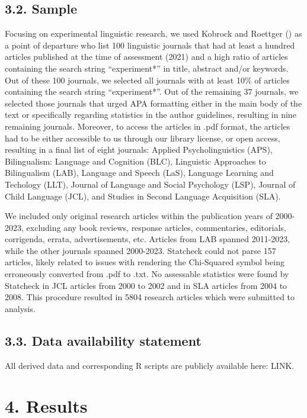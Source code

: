 \documentclass[
  doc,
  longtable,
  nolmodern,
  notxfonts,
  notimes,
  colorlinks=true,linkcolor=blue,citecolor=blue,urlcolor=blue]{apa7}
\begin{document}
\subsection{3.2. Sample}\label{sample}

Focusing on experimental linguistic research, we used Kobrock and
Roettger () as a point of
departure who list 100 linguistic journals that had at least a hundred
articles published at the time of assessment (2021) and a high ratio of
articles containing the search string ``experiment*'' in title, abstract
and/or keywords. Out of these 100 journals, we selected all journals
with at least 10\% of articles containing the search string
``experiment*''. Out of the remaining 37 journals, we selected those
journals that urged APA formatting either in the main body of the text
or specifically regarding statistics in the author guidelines, resulting
in nine remaining journals. Moreover, to access the articles in .pdf
format, the articles had to be either accessible to us through our
library license, or open access, resulting in a final list of eight
journals: Applied Psycholinguistics (APS), Bilingualism: Language and
Cognition (BLC), Linguistic Approaches to Bilingualism (LAB), Language
and Speech (LaS), Language Learning and Techology (LLT), Journal of
Language and Social Psychology (LSP), Journal of Child Language (JCL),
and Studies in Second Language Acquisition (SLA).

We included only original research articles within the publication years
of 2000-2023, excluding any book reviews, response articles,
commentaries, editorials, corrigenda, errata, advertisements, etc.
Articles from LAB spanned 2011-2023, while the other journals spanned
2000-2023. Statcheck could not parse 157 articles, likely related to
issues with rendering the Chi-Squared symbol being erroneously converted
from .pdf to .txt. No assessable statistics were found by Statcheck in
JCL articles from 2000 to 2002 and in SLA articles from 2004 to 2008.
This procedure resulted in 5804 research articles which were submitted
to analysis.

\subsection{3.3. Data availability
statement}\label{data-availability-statement}

All derived data and corresponding R scripts are publicly available
here: LINK.

\section{4. Results}\label{results}
\end{document}
